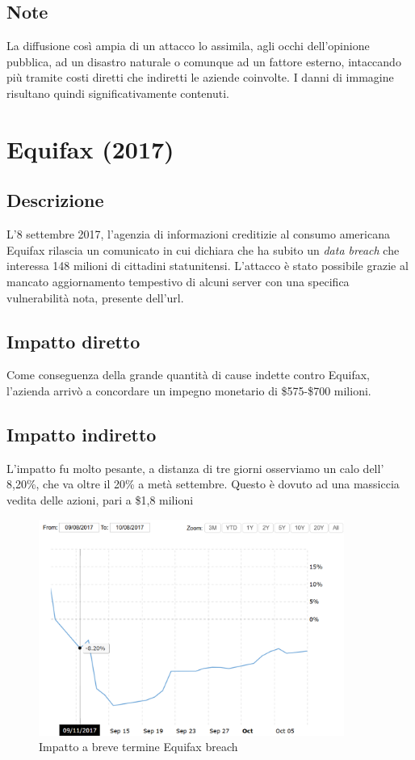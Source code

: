 \documentclass[12pt,a4paper,openright,twoside]{report}
\begin{document}
\subsection{Note}

La diffusione cos\`i ampia di un attacco lo assimila, agli occhi dell'opinione pubblica, ad un disastro naturale o comunque ad un fattore esterno, intaccando pi\`u tramite costi diretti che indiretti le aziende coinvolte. I danni di immagine risultano quindi significativamente contenuti.

\section{Equifax (2017)}
\subsection{Descrizione}
L'8 settembre 2017, l'agenzia di informazioni creditizie al consumo americana Equifax rilascia un comunicato in cui dichiara che ha subito un \textit{data breach} che interessa  148 milioni di cittadini statunitensi. L'attacco \`e stato possibile grazie al mancato aggiornamento tempestivo di alcuni server con una specifica vulnerabilit\`a nota, presente dell'url\cite{Equifax_case_study_2}.\\
\subsection{Impatto diretto}
Come conseguenza della grande quantit\`a di cause indette contro Equifax, l'azienda arriv\`o a concordare un impegno monetario di \$575-\$700 milioni\cite{Equifax_settlement}.\\
\subsection{Impatto indiretto}
L'impatto fu molto pesante, a distanza di tre giorni osserviamo un calo dell' 8,20\%, che va oltre il 20\% a met\`a settembre. Questo \`e dovuto ad una massiccia vedita delle azioni, pari a \$1,8 milioni\cite{Uber_plusEquifaxAndYahoo}\\

\begin{figure}[H] 
\begin{center} 
\includegraphics[width=10cm]{figures/equifax_short.png} 
\caption[Grafico Equifax short]{Impatto a breve termine Equifax breach}\label{fig:eqx1}
\end{center}
\end{figure}
\end{document}

